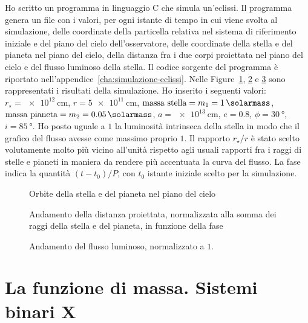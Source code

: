 Ho scritto un programma in linguaggio C che simula un'eclissi. Il programma
genera un file con i valori, per ogni istante di tempo in cui viene svolta al
simulazione, delle coordinate della particella relativa nel sistema di
riferimento iniziale e del piano del cielo dell'osservatore, delle coordinate
della stella e del pianeta nel piano del cielo, della distanza fra i due corpi
proiettata nel piano del cielo e del flusso luminoso della stella. Il codice
sorgente del programma è riportato
nell'appendice~\ref{cha:simulazione-eclissi}. Nelle
Figure~\ref{fig:sim-ecl-piano-cielo}, \ref{fig:sim-ecl-distanza-proiettata} e
\ref{fig:sim-ecl-flusso} sono rappresentati i risultati della simulazione. Ho
inserito i seguenti valori: $r_\star = \SI{e12}{\centi\metre}$,
$r = \SI{5e11}{\centi\metre}$, $\text{massa stella} = m_1 = \SI{1}{\solarmass}$,
$\text{massa pianeta} = m_2 = \SI{0.05}{\solarmass}$,
$a = \SI{e13}{\centi\metre}$, $e = 0.8$, $\phi = \SI{30}{\degree}$,
$i = \SI{85}{\degree}$. Ho posto uguale a $1$ la luminosità intrinseca della
stella in modo che il grafico del flusso avesse come massimo proprio $1$. Il
rapporto $r_\star / r$ è stato scelto volutamente molto più vicino all'unità
rispetto agli usuali rapporti fra i raggi di stelle e pianeti in maniera da
rendere più accentuata la curva del flusso. La fase indica la quantità $(t -
t_0)/P$, con $t_0$ istante iniziale scelto per la simulazione.

\begin{figure}
  \centering
  
  \caption{Orbite della stella e del pianeta nel piano del cielo} %
  \label{fig:sim-ecl-piano-cielo}
\end{figure}
\begin{figure}
  
  \caption[Distanza proiettata in funzione della fase]{Andamento della distanza
    proiettata, normalizzata alla somma dei raggi della stella e del pianeta, in
    funzione della fase}
  \label{fig:sim-ecl-distanza-proiettata}
\end{figure}
\begin{figure}
  
  \caption[Flusso luminoso di un sistema binario]{Andamento del flusso luminoso,
  normalizzato a $1$.}
  \label{fig:sim-ecl-flusso}
\end{figure}

\section{La funzione di massa. Sistemi binari X}
\label{sec:funzione-massa}

